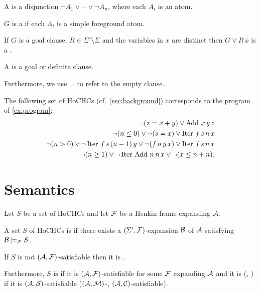 \documentclass[a4paper,twoside,notitlepage,openright,11pt]{report}
\begin{document}
\begin{definition}
  \begin{thmlist}
  \item A  is a disjunction $\neg A_1\lor\cdots\lor\neg A_n$, where each $A_i$ is an atom. 
  \item $G$ is a  if each $A_i$ is a simple foreground atom. 
  \item If $G$ is a goal clause,  $R\in\Sigma'\setminus\Sigma$ and the variables in $\overline x$ are distinct then $G\lor R\,\overline x$ is a . 
  \item A  is a goal or definite clause.
  \end{thmlist}
\end{definition}
Furthermore, we use $\bot$ to refer to the empty clause.



\begin{example}
  \label{ex:HoCHC}
  The following set of HoCHCs (cf.\ \cref{sec:background}) corresponds to the program of \cref{ex:program}:
  \begin{align*}
    \neg(z=x+y)\lor \operatorname{Add}\,x\,y\,z\\
    \neg(n\leq 0)\lor\neg (s=x) \lor \operatorname{Iter}\,f\,s\,n\,x\\
    \neg(n>0)\lor\neg \operatorname{Iter}\,f\,s\,(n-1)\,y\lor\neg(f\,n\,y\,x) \lor \operatorname{Iter}\,f\,s\,n\,x\\
    \neg (n\geq 1)\lor\neg\operatorname{Iter}\,\operatorname{Add}\,n\,n\,x\lor\neg(x\leq n+n).
  \end{align*}
\end{example}

\section{Semantics}

\begin{definition}
  Let $S$ be a set of HoCHCs and let $\mathcal F$ be a Henkin frame expanding $\mathcal A$.
  \begin{thmlist}
  \item A set $S$ of HoCHCs is  if there exists a $(\Sigma',\mathcal F)$-expansion $\mathcal B$ of $\mathcal A$ satisfying $\mathcal B\models_\mathcal F S$. 
  \item If $S$ is not $(\mathcal A,\mathcal F)$-satisfiable then it is .
  \end{thmlist}
  Furthermore, $S$ is  if it is $(\mathcal A,\mathcal F)$-satisfiable for some $\mathcal F$ expanding $\mathcal A$ and it is  (, ) if it is $(\mathcal A,\mathcal S)$-satisfiable ($(\mathcal A,\mathcal M)$-, $(\mathcal A,\mathcal C)$-satisfiable).
\end{definition}
\end{document}
